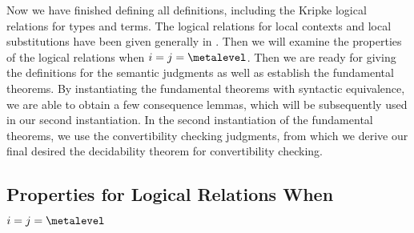 Now we have finished defining all definitions, including the Kripke logical relations
for types and terms. %
The logical relations for local contexts and local substitutions have been given
generally in . %
Then we will examine the properties of the logical relations when $i = j = \metalevel$. %
Then we are ready for giving the definitions for the semantic judgments as well as
establish the fundamental theorems. %
By instantiating the fundamental theorems with syntactic equivalence, we are able to
obtain a few consequence lemmas, which will be subsequently used in our second
instantiation. %
In the second instantiation of the fundamental theorems, we use the convertibility
checking judgments, from which we derive our final desired the decidability theorem
for convertibility checking. %


\subsection{Properties for Logical Relations When $i = j = \metalevel$}

